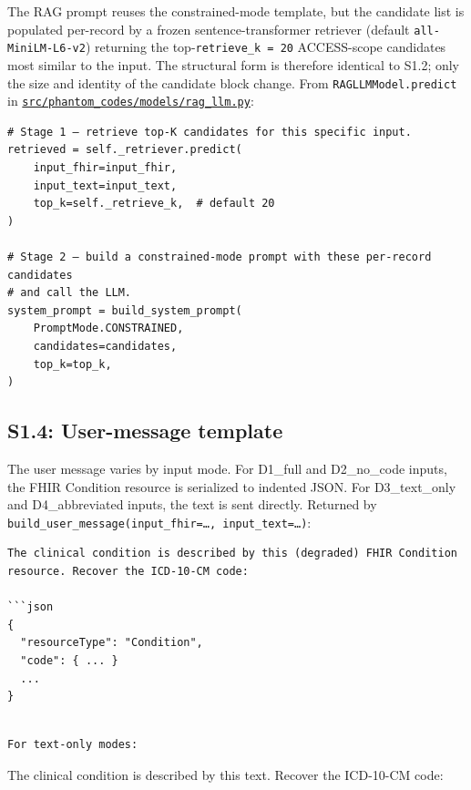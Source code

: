 The RAG prompt reuses the constrained-mode template, but the
candidate list is populated per-record by a frozen
sentence-transformer retriever (default \texttt{all-MiniLM-L6-v2}) returning
the top-\texttt{retrieve\_k\ =\ 20} ACCESS-scope candidates most similar to the
input. The structural form is therefore identical to S1.2; only the
size and identity of the candidate block change. From
\texttt{RAGLLMModel.predict} in
\href{https://github.com/briankfung/phantom-codes/blob/main/src/phantom_codes/models/rag_llm.py}{\texttt{src/phantom\_codes/models/rag\_llm.py}}:

\begin{verbatim}
# Stage 1 — retrieve top-K candidates for this specific input.
retrieved = self._retriever.predict(
    input_fhir=input_fhir,
    input_text=input_text,
    top_k=self._retrieve_k,  # default 20
)

# Stage 2 — build a constrained-mode prompt with these per-record candidates
# and call the LLM.
system_prompt = build_system_prompt(
    PromptMode.CONSTRAINED,
    candidates=candidates,
    top_k=top_k,
)
\end{verbatim}

\subsection{S1.4: User-message template}\label{s1.4-user-message-template}

The user message varies by input mode. For D1\_full and D2\_no\_code
inputs, the FHIR Condition resource is serialized to indented JSON.
For D3\_text\_only and D4\_abbreviated inputs, the text is sent
directly. Returned by \texttt{build\_user\_message(input\_fhir=…,\ input\_text=…)}:

\begin{verbatim}
The clinical condition is described by this (degraded) FHIR Condition
resource. Recover the ICD-10-CM code:

```json
{
  "resourceType": "Condition",
  "code": { ... }
  ...
}
\end{verbatim}

\begin{verbatim}

For text-only modes:
\end{verbatim}

The clinical condition is described by this text. Recover the
ICD-10-CM code:

